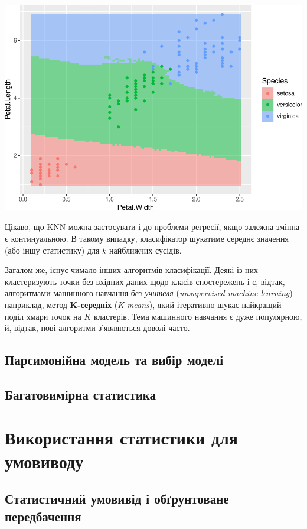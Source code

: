 \documentclass[
  11pt,
]{book}
\begin{document}
\includegraphics{bookdown-demo_files/figure-latex/unnamed-chunk-20-2.pdf}

Цікаво, що KNN можна застосувати і до проблеми регресії, якщо залежна змінна є континуальною. В такому випадку, класифікатор шукатиме середнє значення (або іншу статистику) для \(k\) найближчих сусідів.

Загалом же, існує чимало інших алгоритмів класифікації. Деякі із них кластеризують точки без вхідних даних щодо класів спостережень і є, відтак, алгоритмами машинного навчання \emph{без учителя} (\emph{unsupervised machine learning}) -- наприклад, метод \textbf{K-середніх} (\emph{K-means}), який ітеративно шукає найкращий поділ хмари точок на \(K\) кластерів. Тема машинного навчання є дуже популярною, й, відтак, нові алгоритми з'являються доволі часто.

\subsection{Парсимонійна модель та вибір моделі}\label{aic}

\subsection{Багатовимірна статистика}\label{prcomp}

\section{Використання статистики для умовиводу}\label{infer}

\subsection{Статистичний умовивід і обґрунтоване передбачення}\label{inference}
\end{document}
